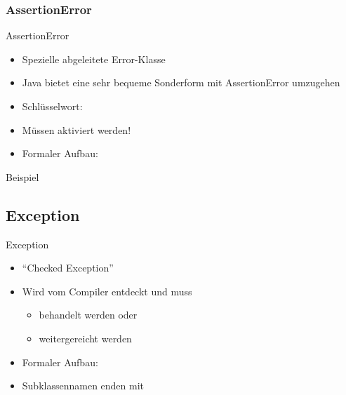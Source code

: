 \documentclass{../tuda-beamer}
\begin{document}
    \subsubsection{AssertionError}
    \label{subsubsec:assertion-error}
    \begin{frame}{AssertionError}
        \begin{itemize}
            \item Spezielle abgeleitete Error-Klasse
            \item Java bietet eine sehr bequeme Sonderform mit AssertionError umzugehen
            \item Schlüsselwort: 
            \item Müssen aktiviert werden!
            \item Formaler Aufbau:

            
        \end{itemize}
    \end{frame}

    \begin{frame}[c]{Beispiel}
        
    \end{frame}

    \subsection{Exception}
    \label{subsec:exception}
    \begin{frame}[c]{Exception}
        \begin{itemize}
            \item \enquote{Checked Exception}
            \item Wird vom Compiler entdeckt und muss
            \begin{itemize}{}
                \item behandelt werden oder
                \item weitergereicht werden
            \end{itemize}
            \item Formaler Aufbau:
            \begin{center}
            \end{center}
            \item Subklassennamen enden mit 
        \end{itemize}
    \end{frame}
\end{document}
